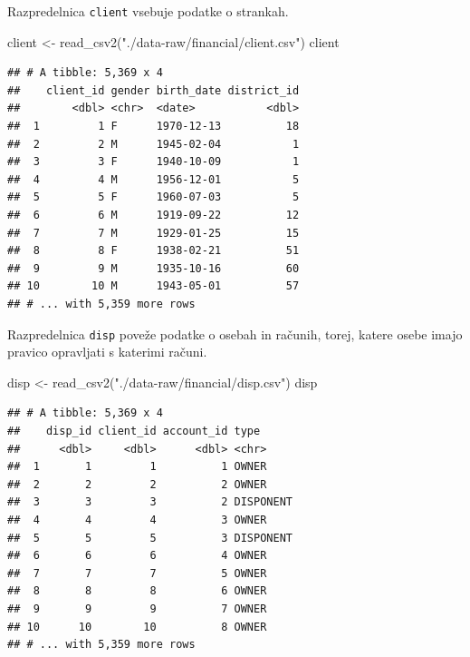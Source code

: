 \documentclass[
]{book}
\newenvironment{Shaded}{\begin{snugshade}}{\end{snugshade}}
\newcommand{\FunctionTok}[1]{\textcolor[rgb]{0.00,0.00,0.00}{#1}}
\newcommand{\NormalTok}[1]{#1}
\newcommand{\OtherTok}[1]{\textcolor[rgb]{0.56,0.35,0.01}{#1}}
\newcommand{\StringTok}[1]{\textcolor[rgb]{0.31,0.60,0.02}{#1}}
\begin{document}
Razpredelnica \texttt{client} vsebuje podatke o strankah.

\begin{Shaded}
\begin{Highlighting}[]
\NormalTok{client }\OtherTok{\textless{}{-}} \FunctionTok{read\_csv2}\NormalTok{(}\StringTok{"./data{-}raw/financial/client.csv"}\NormalTok{)}
\NormalTok{client}
\end{Highlighting}
\end{Shaded}

\begin{verbatim}
## # A tibble: 5,369 x 4
##    client_id gender birth_date district_id
##        <dbl> <chr>  <date>           <dbl>
##  1         1 F      1970-12-13          18
##  2         2 M      1945-02-04           1
##  3         3 F      1940-10-09           1
##  4         4 M      1956-12-01           5
##  5         5 F      1960-07-03           5
##  6         6 M      1919-09-22          12
##  7         7 M      1929-01-25          15
##  8         8 F      1938-02-21          51
##  9         9 M      1935-10-16          60
## 10        10 M      1943-05-01          57
## # ... with 5,359 more rows
\end{verbatim}

Razpredelnica \texttt{disp} poveže podatke o osebah in računih, torej, katere osebe imajo pravico opravljati s katerimi računi.

\begin{Shaded}
\begin{Highlighting}[]
\NormalTok{disp }\OtherTok{\textless{}{-}} \FunctionTok{read\_csv2}\NormalTok{(}\StringTok{"./data{-}raw/financial/disp.csv"}\NormalTok{)}
\NormalTok{disp}
\end{Highlighting}
\end{Shaded}

\begin{verbatim}
## # A tibble: 5,369 x 4
##    disp_id client_id account_id type     
##      <dbl>     <dbl>      <dbl> <chr>    
##  1       1         1          1 OWNER    
##  2       2         2          2 OWNER    
##  3       3         3          2 DISPONENT
##  4       4         4          3 OWNER    
##  5       5         5          3 DISPONENT
##  6       6         6          4 OWNER    
##  7       7         7          5 OWNER    
##  8       8         8          6 OWNER    
##  9       9         9          7 OWNER    
## 10      10        10          8 OWNER    
## # ... with 5,359 more rows
\end{verbatim}
\end{document}
